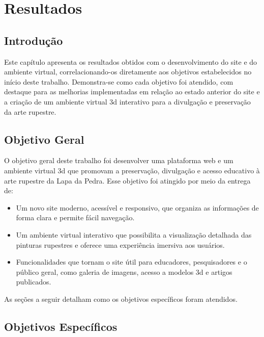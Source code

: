  \chapter{Resultados}
\label{cap:resultados}

\section{Introdução}
Este capítulo apresenta os resultados obtidos com o desenvolvimento do site e do ambiente virtual, correlacionando-os diretamente aos objetivos estabelecidos no início deste trabalho. Demonstra-se como cada objetivo foi atendido, com destaque para as melhorias implementadas em relação ao estado anterior do site e a criação de um ambiente virtual \gls{3d} interativo para a divulgação e preservação da arte rupestre.

\section{Objetivo Geral}
O objetivo geral deste trabalho foi desenvolver uma plataforma web e um ambiente virtual \gls{3d} que promovam a preservação, divulgação e acesso educativo à arte rupestre da Lapa da Pedra. Esse objetivo foi atingido por meio da entrega de:
\begin{itemize}
    \item Um novo site moderno, acessível e responsivo, que organiza as informações de forma clara e permite fácil navegação.
    \item Um ambiente virtual interativo que possibilita a visualização detalhada das pinturas rupestres e oferece uma experiência imersiva aos usuários.
    \item Funcionalidades que tornam o site útil para educadores, pesquisadores e o público geral, como galeria de imagens, acesso a modelos \gls{3d} e artigos publicados.
\end{itemize}

As seções a seguir detalham como os objetivos específicos foram atendidos.

\section{Objetivos Específicos}

